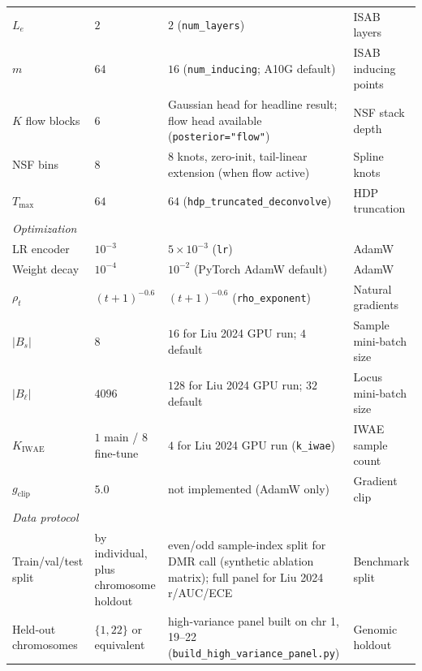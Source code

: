 \begin{center}
{\begin{tabular}{llll}
$L_e$ & $2$ & $2$ (\texttt{num\_layers}) & ISAB layers\\
$m$ & $64$ & $16$ (\texttt{num\_inducing}; A10G default) & ISAB inducing points\\
$K$ flow blocks & $6$ & Gaussian head for headline result; flow head available (\texttt{posterior="flow"}) & NSF stack depth\\
NSF bins & $8$ & $8$ knots, zero-init, tail-linear extension (when flow active) & Spline knots\\
$T_{\max}$ & $64$ & $64$ (\texttt{hdp\_truncated\_deconvolve}) & HDP truncation\\
\midrule
\multicolumn{4}{l}{\emph{Optimization}}\\
LR encoder & $10^{-3}$ & $5\times 10^{-3}$ (\texttt{lr}) & AdamW\\
Weight decay & $10^{-4}$ & $10^{-2}$ (PyTorch AdamW default) & AdamW\\
$\rho_t$ & $(t+1)^{-0.6}$ & $(t+1)^{-0.6}$ (\texttt{rho\_exponent}) & Natural gradients\\
$|B_s|$ & $8$ & $16$ for Liu 2024 GPU run; $4$ default & Sample mini-batch size\\
$|B_\ell|$ & $4096$ & $128$ for Liu 2024 GPU run; $32$ default & Locus mini-batch size\\
$K_{\mathrm{IWAE}}$ & $1$ main / $8$ fine-tune & $4$ for Liu 2024 GPU run (\texttt{k\_iwae}) & IWAE sample count\\
$g_{\mathrm{clip}}$ & $5.0$ & not implemented (AdamW only) & Gradient clip\\
\midrule
\multicolumn{4}{l}{\emph{Data protocol}}\\
Train/val/test split & by individual, plus chromosome holdout & even/odd sample-index split for DMR call (synthetic ablation matrix); full panel for Liu 2024 r/AUC/ECE & Benchmark split\\
Held-out chromosomes & $\{1,22\}$ or equivalent & high-variance panel built on chr 1, 19--22 (\texttt{build\_high\_variance\_panel.py}) & Genomic holdout\\
\bottomrule
\end{tabular}%
}
\end{center}

